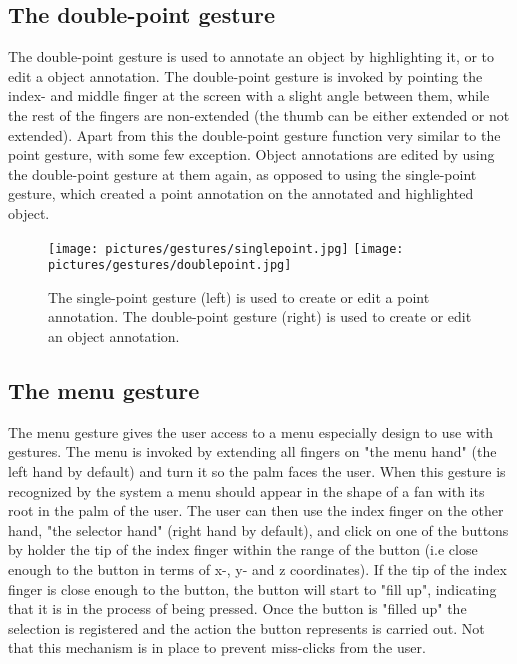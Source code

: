\subsection{The double-point gesture}
The double-point gesture is used to annotate an object by highlighting it, or to edit a object annotation. The double-point gesture is invoked by pointing the index- and
middle finger at the screen with a slight angle between them, while the rest of the fingers are non-extended (the thumb can be either extended or not extended).
Apart from this the double-point gesture function very similar to the point gesture, with some few exception. Object annotations are edited by using the 
double-point gesture at them again, as opposed to using the single-point gesture, which created a point annotation on the annotated and highlighted object.

\begin{figure}%
	\texttt{[image: pictures/gestures/singlepoint.jpg]}
    \texttt{[image: pictures/gestures/doublepoint.jpg]}
	\caption[The single-point and double-point gestures]{The single-point gesture (left) is used to create or edit a point annotation. 
             The double-point gesture (right) is used to create or edit an object annotation.}
	\label{fig:gestures3}
\end{figure} 

\subsection{The menu gesture}
The menu gesture gives the user access to a menu especially design to use with gestures. The menu is invoked by extending all fingers on 
"the menu hand" (the left hand by default) and turn it so the palm faces the user. When this gesture is recognized by the system a menu should 
appear in the shape of a fan with its root in the palm of the user. The user can then use the index finger on the other hand, "the selector hand" (right hand by default),
and click on one of the buttons by holder the tip of the index finger within the range of the button (i.e close enough to the button in terms of x-, y- and z coordinates).
If the tip of the index finger is close enough to the button, the button will start to "fill up", indicating that it is in the process of being pressed.
Once the button is "filled up" the selection is registered and the action the button represents is carried out. Not that this mechanism is in place
to prevent miss-clicks from the user.